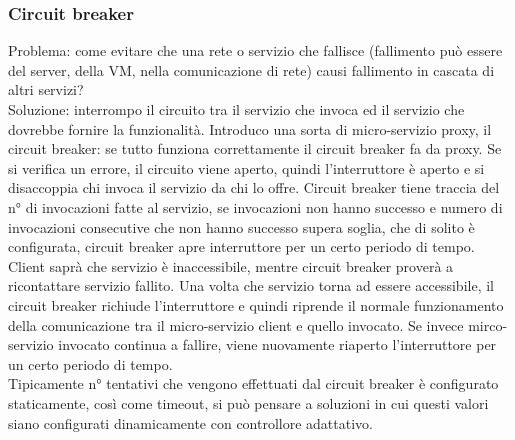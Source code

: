 \documentclass{article}
\begin{document}
\subsubsection{Circuit breaker}
Problema: come evitare che una rete o servizio che fallisce (fallimento può essere del server, della VM, nella comunicazione di rete) causi fallimento in cascata di altri servizi?\\ Soluzione: interrompo il circuito tra il servizio che invoca ed il servizio che dovrebbe fornire la funzionalità. Introduco una sorta di micro-servizio proxy, il circuit breaker: se tutto funziona correttamente il circuit breaker fa da proxy. Se si verifica un errore, il circuito viene aperto, quindi l'interruttore è aperto e si disaccoppia chi invoca il servizio da chi lo offre. Circuit breaker tiene traccia del n° di invocazioni fatte al servizio, se invocazioni non hanno successo e numero di invocazioni consecutive che non hanno successo supera soglia, che di solito è configurata, circuit breaker apre interruttore per un certo periodo di tempo. Client saprà che servizio è inaccessibile, mentre circuit breaker proverà a ricontattare servizio fallito. Una volta che servizio torna ad essere accessibile, il circuit breaker richiude l'interruttore e quindi riprende il normale funzionamento della comunicazione tra il micro-servizio client e quello invocato. Se invece mirco-servizio invocato continua a fallire, viene nuovamente riaperto l'interruttore per un certo periodo di tempo.\\ Tipicamente n° tentativi che vengono effettuati dal circuit breaker è configurato staticamente, così come timeout, si può pensare a soluzioni in cui questi valori siano configurati dinamicamente con controllore adattativo.
\end{document}
